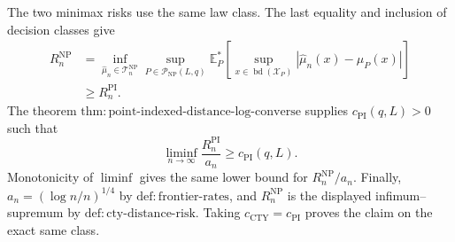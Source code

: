 The two minimax risks use the same law class.  The last equality and inclusion of decision classes give
\[
\begin{aligned}
 R_n^{\mathrm{NP}}
 &=\inf_{\widehat\mu_n\in\mathcal T_n^{\mathrm{NP}}}
   \sup_{P\in\mathcal P_{\mathrm{NP}}(L,q)}
   \mathbb E_P^*\!\left[
     \sup_{x\in\operatorname{bd}(\mathcal X_P)}
     |\widehat\mu_n(x)-\mu_P(x)|
   \right]\\
 &\geq R_n^{\mathrm{PI}}.
\end{aligned}
\]
The theorem \(\mathrm{thm:point\text{-}indexed\text{-}distance\text{-}log\text{-}converse}\) supplies \(c_{\mathrm{PI}}(q,L)>0\) such that
\[
 \liminf_{n\to\infty}\frac{R_n^{\mathrm{PI}}}{a_n}
 \geq c_{\mathrm{PI}}(q,L).
\]
Monotonicity of \(\liminf\) gives the same lower bound for \(R_n^{\mathrm{NP}}/a_n\).  Finally, \(a_n=(\log n/n)^{1/4}\) by \(\mathrm{def:frontier\text{-}rates}\), and \(R_n^{\mathrm{NP}}\) is the displayed infimum--supremum by \(\mathrm{def:cty\text{-}distance\text{-}risk}\).  Taking \(c_{\mathrm{CTY}}=c_{\mathrm{PI}}\) proves the claim on the exact same class.